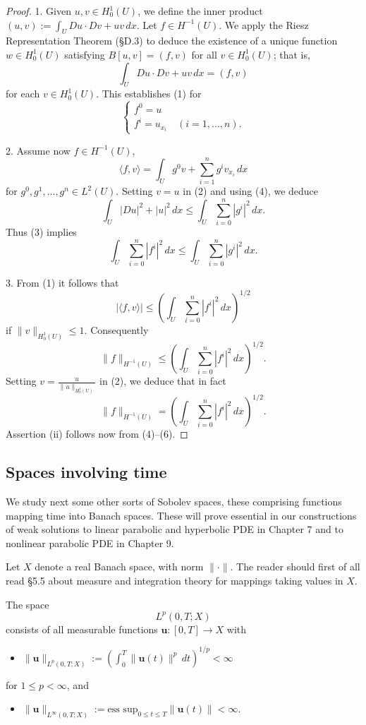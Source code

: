 \begin{proof}
1. Given $u, v \in H_0^1(U)$, we define the inner product $(u,v) := \int_U Du \cdot Dv + uv\,dx$. Let $f \in H^{-1}(U)$. We apply the Riesz Representation Theorem (§D.3) to deduce the existence of a unique function $w \in H_0^1(U)$ satisfying $B[u,v] = (f,v)$ for all $v \in H_0^1(U)$; that is,
$$\int_U Du \cdot Dv + uv\,dx = (f,v) \tag{2}$$
for each $v \in H_0^1(U)$. This establishes (1) for
$$\begin{cases} f^0 = u \\ f^i = u_{x_i} \quad (i = 1, \ldots, n). \end{cases} \tag{3}$$

2. Assume now $f \in H^{-1}(U)$,
$$\langle f, v \rangle = \int_U g^0 v + \sum_{i=1}^n g^i v_{x_i}\,dx \tag{4}$$
for $g^0, g^1, \ldots, g^n \in L^2(U)$. Setting $v = u$ in (2) and using (4), we deduce
$$\int_U |Du|^2 + |u|^2\,dx \le \int_U \sum_{i=0}^n |g^i|^2\,dx.$$
Thus (3) implies
$$\int_U \sum_{i=0}^n |f^i|^2\,dx \le \int_U \sum_{i=0}^n |g^i|^2\,dx. \tag{5}$$

3. From (1) it follows that
$$|\langle f, v \rangle| \le \left(\int_U \sum_{i=0}^n |f^i|^2\,dx\right)^{1/2}$$
if $\|v\|_{H_0^1(U)} \le 1$. Consequently
$$\|f\|_{H^{-1}(U)} \le \left(\int_U \sum_{i=0}^n |f^i|^2\,dx\right)^{1/2}.$$
Setting $v = \frac{u}{\|u\|_{H_0^1(U)}}$ in (2), we deduce that in fact
$$\|f\|_{H^{-1}(U)} = \left(\int_U \sum_{i=0}^n |f^i|^2\,dx\right)^{1/2}. \tag{6}$$
Assertion (ii) follows now from (4)--(6).
\end{proof}

\subsection{Spaces involving time}

We study next some other sorts of Sobolev spaces, these comprising functions mapping time into Banach spaces. These will prove essential in our constructions of weak solutions to linear parabolic and hyperbolic PDE in Chapter 7 and to nonlinear parabolic PDE in Chapter 9.

Let $X$ denote a real Banach space, with norm $\|\cdot\|$. The reader should first of all read §5.5 about measure and integration theory for mappings taking values in $X$.

\begin{definition}[$L^p(0,T;X)$]
\label{def:lp-time-banach-space}
The space
$$L^p(0, T; X)$$
consists of all measurable functions $\mathbf{u} : [0, T] \to X$ with
\begin{itemize}
\item[(i)] $\|\mathbf{u}\|_{L^p(0,T;X)} := \left(\int_0^T \|\mathbf{u}(t)\|^p\,dt\right)^{1/p} < \infty$
\end{itemize}
for $1 \le p < \infty$, and
\begin{itemize}
\item[(ii)] $\|\mathbf{u}\|_{L^\infty(0,T;X)} := \text{ess sup}_{0 \le t \le T} \|\mathbf{u}(t)\| < \infty$.
\end{itemize}
\end{definition}


